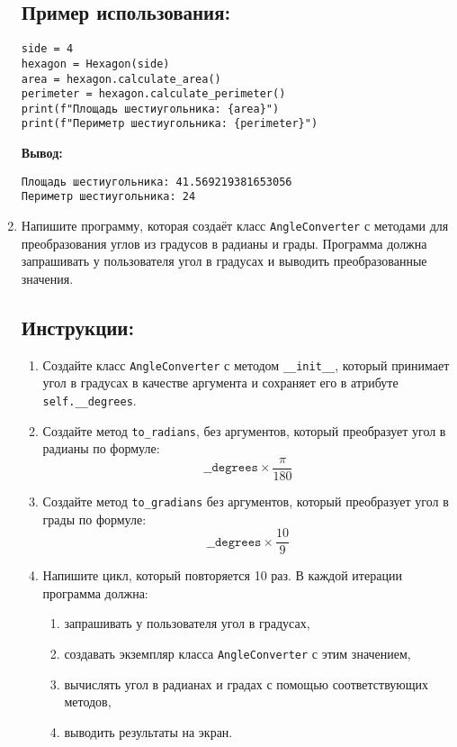 \begin{enumerate}
\subsection*{Пример использования:}
\begin{verbatim}
side = 4
hexagon = Hexagon(side)
area = hexagon.calculate_area()
perimeter = hexagon.calculate_perimeter()
print(f"Площадь шестиугольника: {area}")
print(f"Периметр шестиугольника: {perimeter}")
\end{verbatim}

\textbf{Вывод:}
\begin{verbatim}
Площадь шестиугольника: 41.569219381653056
Периметр шестиугольника: 24
\end{verbatim}

\item
Напишите программу, которая создаёт класс \texttt{AngleConverter} с методами для преобразования углов
из градусов в радианы и грады. Программа должна запрашивать у пользователя угол в градусах
и выводить преобразованные значения.

\subsection*{Инструкции:}
\begin{enumerate}
\item Создайте класс \texttt{AngleConverter} с методом
\texttt{\_\_init\_\_}, который принимает угол в градусах в
качестве аргумента и сохраняет его в атрибуте \texttt{self.\_\_degrees}.

\item Создайте метод \texttt{to\_radians},
без аргументов, который преобразует угол в радианы по формуле:
\[
\texttt{\_\_degrees} \times \frac{\pi}{180}
\]

\item Создайте метод \texttt{to\_gradians} без аргументов,
который преобразует угол в грады по формуле:
\[
\texttt{\_\_degrees} \times \frac{10}{9}
\]

\item Напишите цикл, который повторяется 10 раз. В каждой итерации программа должна:
\begin{enumerate}
\item запрашивать у пользователя угол в градусах,
\item создавать экземпляр класса \texttt{AngleConverter} с этим значением,
\item вычислять угол в радианах и градах с помощью соответствующих методов,
\item выводить результаты на экран.
\end{enumerate}
\end{enumerate}


\end{enumerate}
